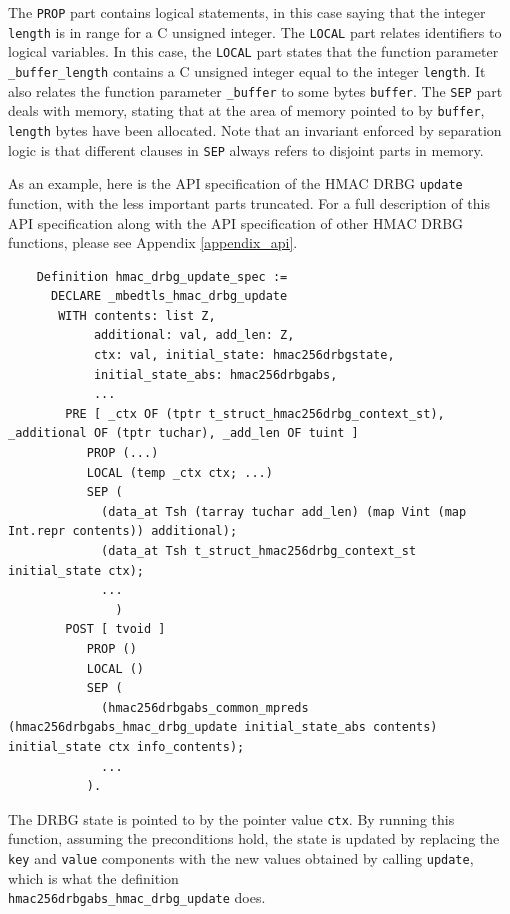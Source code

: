 \documentclass[pageno]{jpaper}
\begin{document}
The \lstinline{PROP} part contains logical statements, in this case saying that the integer \lstinline{length} is in range for a C unsigned integer. The \lstinline{LOCAL} part relates identifiers to logical variables. In this case, the \lstinline{LOCAL} part states that the function parameter \lstinline{_buffer_length} contains a C unsigned integer equal to the integer \lstinline{length}. It also relates the function parameter \lstinline{_buffer} to some bytes \lstinline{buffer}. The \lstinline{SEP} part deals with memory, stating that at the area of memory pointed to by \lstinline{buffer}, \lstinline{length} bytes have been allocated. Note that an invariant enforced by separation logic is that different clauses in \lstinline{SEP} always refers to disjoint parts in memory.

As an example, here is the API specification of the HMAC DRBG \lstinline{update} function, with the less important parts truncated. For a full description of this API specification along with the API specification of other HMAC DRBG functions, please see Appendix \ref{appendix_api}.

\begin{lstlisting}
    Definition hmac_drbg_update_spec :=
      DECLARE _mbedtls_hmac_drbg_update
       WITH contents: list Z,
            additional: val, add_len: Z,
            ctx: val, initial_state: hmac256drbgstate,
            initial_state_abs: hmac256drbgabs,
            ...
        PRE [ _ctx OF (tptr t_struct_hmac256drbg_context_st), _additional OF (tptr tuchar), _add_len OF tuint ]
           PROP (...)
           LOCAL (temp _ctx ctx; ...)
           SEP (
             (data_at Tsh (tarray tuchar add_len) (map Vint (map Int.repr contents)) additional);
             (data_at Tsh t_struct_hmac256drbg_context_st initial_state ctx);
             ...
               )
        POST [ tvoid ]
           PROP ()
           LOCAL ()
           SEP (
             (hmac256drbgabs_common_mpreds (hmac256drbgabs_hmac_drbg_update initial_state_abs contents) initial_state ctx info_contents);
             ...
           ).
\end{lstlisting}

The DRBG state is pointed to by the pointer value \lstinline{ctx}. By running this function, assuming the preconditions hold, the state is updated by replacing the \lstinline{key} and \lstinline{value} components with the new values obtained by calling \lstinline{update}, which is what the definition \\ \lstinline{hmac256drbgabs_hmac_drbg_update} does.
\end{document}
